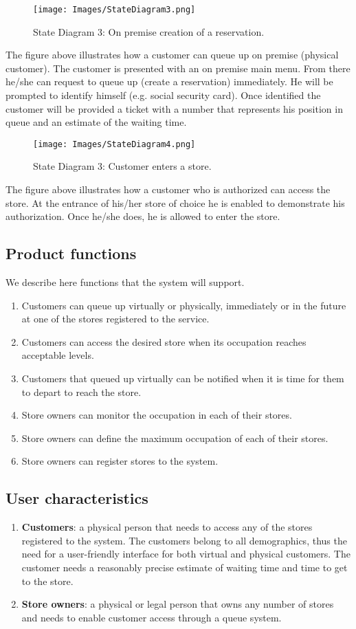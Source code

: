 \begin{figure}[!htb]
	\centering
	\texttt{[image: Images/StateDiagram3.png]}
	\caption{State Diagram 3: On premise creation of a reservation.}
\end{figure}
The figure above illustrates how a customer can queue up on premise (physical customer). The customer is presented with an on premise main menu. From there he/she can request to queue up (create a reservation) immediately. He will be prompted to identify himself (e.g. social security card). Once identified the customer will be provided a ticket with a number that represents his position in queue and an estimate of the waiting time.

\begin{figure}[!htb]
	\centering
	\texttt{[image: Images/StateDiagram4.png]}
	\caption{State Diagram 3: Customer enters a store.}
\end{figure}
The figure above illustrates how a customer who is authorized can access the store. At the entrance of his/her store of choice he is enabled to demonstrate his authorization. Once he/she does, he is allowed to enter the store.

\subsection{Product functions}
We describe here functions that the system will support.
\begin{enumerate}
	\item Customers can queue up virtually or physically, immediately or in the future at one of the stores registered to the service.
	\item Customers can access the desired store when its occupation reaches acceptable levels.
	\item Customers that queued up virtually can be notified when it is time for them to depart to reach the store.
	\item Store owners can monitor the occupation in each of their stores.
	\item Store owners can define the maximum occupation of each of their stores.
	\item Store owners can register stores to the system.
\end{enumerate}

\subsection{User characteristics}
\begin{enumerate}
	\item {\bfseries Customers}: a physical person that needs to access any of the stores registered to the system. The customers belong to all demographics, thus the need for a user-friendly interface for both virtual and physical customers. The customer needs a reasonably precise estimate of waiting time and time to get to the store.
	\item {\bfseries Store owners}: a physical or legal person that owns any number of stores and needs to enable customer access through a queue system.
\end{enumerate}

